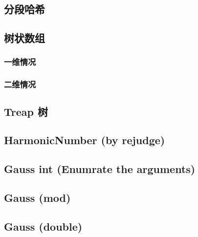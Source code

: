 \documentclass[a4paper]{article}
\begin{document}
\begin{CJK*}{UTF8}{gbsn}
\begin{multicols}{3}
\begin{flushleft}
\subsection{分段哈希}


\subsection{树状数组}


\subsubsection{一维情况}




\subsubsection{二维情况}


\subsection{Treap 树}


\subsection{HarmonicNumber (by rejudge)}


\subsection{Gauss int (Enumrate the arguments)}


\subsection{Gauss (mod)}


\subsection{Gauss (double)}



\end{flushleft}
\end{multicols}
\end{CJK*}
\end{document}
